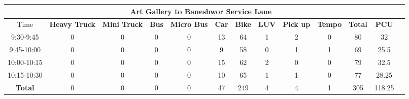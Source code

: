 \begin{landscape}
\begin{table}[h!]
\begin{tabular}{|c|c|c|c|c|c|c|c|c|c|c|c|c|}
    \hline
    \multicolumn{12}{|c|}{\textbf{Art Gallery to Baneshwor Service Lane}} \\
    \hline
        Time & \textbf{Heavy Truck} & \textbf{Mini Truck} & \textbf{Bus} & \textbf{Micro Bus} & \textbf{Car} & \textbf{Bike} & \textbf{LUV} & \textbf{Pick up} & \textbf{Tempo} & \textbf{\textbf{Total}} & \textbf{PCU} \\
    \hline
    9:30-9:45	&0	&0	&0	&0	&13	&64	&1	&2	&0	&80	&32 \\ \hline
    9:45-10:00	&0	&0	&0	&0	&9	&58	&0	&1	&1	&69	&25.5 \\ \hline
    10:00-10:15	&0	&0	&0	&0	&15	&62	&2	&0	&0	&79	&32.5 \\ \hline
    10:15-10:30	&0	&0	&0	&0	&10	&65	&1	&1	&0	&77	&28.25 \\ \hline
    \textbf{Total} & 0 & 0 & 0 & 0 & 47 & 249 & 4 & 4 & 1 & 305 & 118.25 \\ \hline

    \hline
\end{tabular}

\end{table}
\end{landscape}

